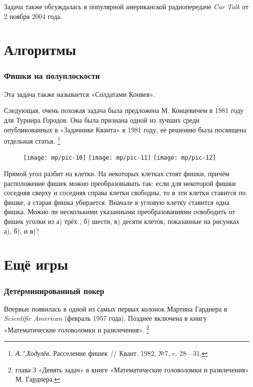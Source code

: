 \documentclass[twoside]{book}
\begin{document}
Задача также обсуждалась в популярной американской радиопередаче \emph{Car Talk} от 2 ноября 2004 года.

\section{Алгоритмы}

\subsubsection{Фишки на полуплоскости}
Эта задача также называется «Солдатами Конвея».

Следующая, очень похожая задача была предложена М. Концевичем в 1981 году для Турнира Городов.
Она была признана одной из лучших среди опубликованных в «Задачнике Кванта» в 1981 году,
её решению была посвящена отдельная статья.
\footnote{\emph{А.",Ходулёв}. Расселение фишек /\!/ Квант. 1982, №7, c. 28---31.}

\begin{figure}[!ht]
\centering
\texttt{[image: mp/pic-10]} %
\hskip7mm
\texttt{[image: mp/pic-11]}
\hskip7mm
\texttt{[image: mp/pic-12]}
\end{figure}

Прямой угол разбит на клетки.
На некоторых клетках стоят фишки, причём расположение фишек можно преобразовывать так: если для некоторой фишки соседняя сверху и соседняя справа клетки свободны, то в эти клетки ставится по фишке, а старая фишка убирается.
Вначале в угловую клетку ставится одна фишка.
Можно ли несколькими указанными преобразованиями освободить от фишек уголки из 
а) трёх , 
б) шести, 
в) десяти клеток,
показанные на рисунках а), б), и в)?


\section{Ещё игры}

\subsubsection{Детерминированный покер}
Впервые появилась в одной из самых первых колонок Мартина Гарднера в \emph{Scientific American} (февраль 1957 года).
Позднее включена в книгу «Математические головоломки и развлечения».%
\footnote{глава 3 «Девять задач» в книге «Математические головоломки и развлечения» М. Гарднера.}
\end{document}
